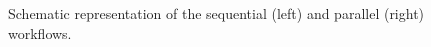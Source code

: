 \begin{figure}[!htp]
	\begin{center}
		\caption{Schematic representation of the \ttDilepKinFit sequential (left) and parallel (right) workflows.}
		\label{fig:Sched}
	\end{center}
\end{figure}

